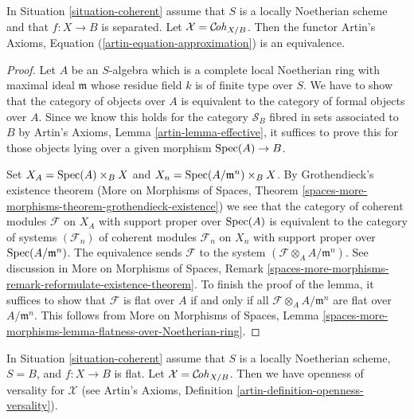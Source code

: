 \begin{lemma}
\label{lemma-coherent-existence}
In Situation \ref{situation-coherent} assume that $S$ is a locally Noetherian
scheme and that $f : X \to B$ is separated.
Let $\mathcal{X} = \mathcal{C}\!\mathit{oh}_{X/B}$. Then the functor
Artin's Axioms, Equation (\ref{artin-equation-approximation})
is an equivalence.
\end{lemma}

\begin{proof}
Let $A$ be an $S$-algebra which is a complete local Noetherian ring
with maximal ideal $\mathfrak m$
whose residue field $k$ is of finite type over $S$.
We have to show that the category of objects over $A$ is
equivalent to the category of formal objects over $A$.
Since we know this holds for the category $\mathcal{S}_B$
fibred in sets associated to $B$ by Artin's Axioms, 
Lemma \ref{artin-lemma-effective}, it suffices to prove this
for those objects lying over a given morphism $\mathop{\mathrm{Spec}}(A) \to B$.

\medskip\noindent
Set $X_A = \mathop{\mathrm{Spec}}(A) \times_B X$ and $X_n = \mathop{\mathrm{Spec}}(A/\mathfrak m^n) \times_B X$.
By Grothendieck's existence theorem
(More on Morphisms of Spaces, Theorem
\ref{spaces-more-morphisms-theorem-grothendieck-existence})
we see that the category of coherent modules $\mathcal{F}$
on $X_A$ with support proper over $\mathop{\mathrm{Spec}}(A)$ is equivalent
to the category of systems $(\mathcal{F}_n)$ of coherent modules
$\mathcal{F}_n$ on $X_n$ with support proper over
$\mathop{\mathrm{Spec}}(A/\mathfrak m^n)$. The equivalence sends $\mathcal{F}$
to the system $(\mathcal{F} \otimes_A A/\mathfrak m^n)$. See discussion in
More on Morphisms of Spaces, Remark
\ref{spaces-more-morphisms-remark-reformulate-existence-theorem}.
To finish the proof of the lemma, it suffices to show that
$\mathcal{F}$ is flat over $A$ if and only if all
$\mathcal{F} \otimes_A A/\mathfrak m^n$ are flat over $A/\mathfrak m^n$.
This follows from
More on Morphisms of Spaces, Lemma
\ref{spaces-more-morphisms-lemma-flatness-over-Noetherian-ring}.
\end{proof}

\begin{lemma}
\label{lemma-coherent-defo-thy}
In Situation \ref{situation-coherent} assume that
$S$ is a locally Noetherian scheme, $S = B$, and $f : X \to B$ is flat.
Let $\mathcal{X} = \mathcal{C}\!\mathit{oh}_{X/B}$. Then we have openness of
versality for $\mathcal{X}$ (see
Artin's Axioms, Definition \ref{artin-definition-openness-versality}).
\end{lemma}

